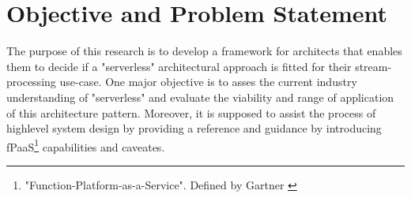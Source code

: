 \section{Objective and Problem Statement}

The purpose of this research is to develop a framework for architects that enables them to decide if a "serverless" architectural approach is fitted for their stream-processing use-case.
One major objective is to asses the current industry understanding of "serverless" and evaluate the viability and range of application of this architecture pattern.
Moreover, it is supposed to assist the process of highlevel system design by providing a reference and guidance by introducing fPaaS\footnote{"Function-Platform-as-a-Service". Defined by Gartner \cite{Chandrasekaran2017EvolutionWhen}} capabilities and caveates. 

